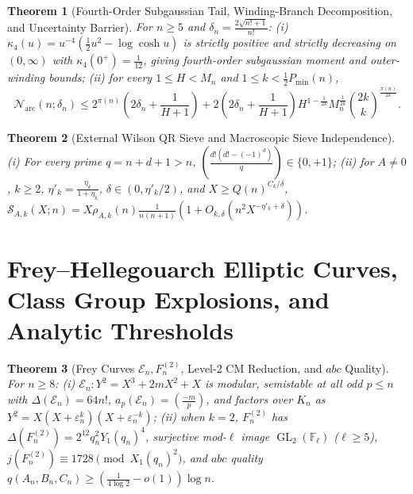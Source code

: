 \documentclass[11pt,reqno]{amsart}
\newtheorem{theorem}{Theorem}[section]
\theoremstyle{remark}
\newcommand{\F}{\mathbb{F}}
\newcommand{\GL}{\operatorname{GL}}
\begin{document}
\begin{theorem}[Fourth-Order Subgaussian Tail, Winding-Branch Decomposition, and Uncertainty Barrier]\label{thm:8.3}
For $n \ge 5$ and $\delta_n = \frac{2\sqrt{n!+1}}{n!}$:
(i) $\kappa_4(u) = u^{-4}(\frac{1}{2}u^2 - \log\cosh u)$ is strictly positive and strictly decreasing on $(0, \infty)$ with $\kappa_4(0^+) = \frac{1}{12}$, giving fourth-order subgaussian moment and outer-winding bounds;
(ii) for every $1 \le H < M_n$ and $1 \le k < \frac{1}{2}P_{\min}(n)$,
\begin{equation}\label{eq:beurling-arc}
\mathcal{N}_{\mathrm{arc}}(n; \delta_n) \le 2^{\pi(n)}\!\left(2\delta_n + \frac{1}{H+1}\right) + 2\!\left(2\delta_n + \frac{1}{H+1}\right) H^{1 - \frac{1}{2k}} M_n^{\frac{1}{2k}} \binom{2k}{k}^{\frac{\pi(n)}{2k}}.
\end{equation}
\end{theorem}

\begin{theorem}[External Wilson QR Sieve and Macroscopic Sieve Independence]\label{thm:8.4}
(i) For every prime $q = n + d + 1 > n$, $(\frac{d!(d! - (-1)^d)}{q}) \in \{0, +1\}$;
(ii) for $A \ne 0$, $k \ge 2$, $\eta'_k = \frac{\eta_k}{1+\eta_k}$, $\delta \in (0, \eta'_k/2)$, and $X \ge Q(n)^{C_k/\delta}$, $\mathcal{S}_{A,k}(X; n) = X \rho_{A,k}(n)\frac{1}{n(n+1)}(1 + O_{k,\delta}(n^2 X^{-\eta'_k + \delta}))$.
\end{theorem}

\section{Frey--Hellegouarch Elliptic Curves, Class Group Explosions, and Analytic Thresholds}

\begin{theorem}[Frey Curves $\mathcal{E}_n, F_n^{(2)}$, Level-2 CM Reduction, and $abc$ Quality]\label{thm:9.1}
For $n \ge 8$: (i) $\mathcal{E}_n : Y^2 = X^3 + 2mX^2 + X$ is modular, semistable at all odd $p \le n$ with $\Delta(\mathcal{E}_n) = 64 n!$, $a_p(\mathcal{E}_n) = (\frac{-m}{p})$, and factors over $K_n$ as $Y^2 = X(X + \varepsilon_n^k)(X + \varepsilon_n^{-k})$; (ii) when $k = 2$, $F_n^{(2)}$ has $\Delta(F_n^{(2)}) = 2^{12} q_n^2 Y_1(q_n)^4$, surjective mod-$\ell$ image $\GL_2(\F_\ell)$ ($\ell \ge 5$), $j(F_n^{(2)}) \equiv 1728 \pmod{X_1(q_n)^2}$, and $abc$ quality $q(A_n, B_n, C_n) \ge (\frac{1}{4\log 2} - o(1))\log n$.
\end{theorem}
\end{document}
